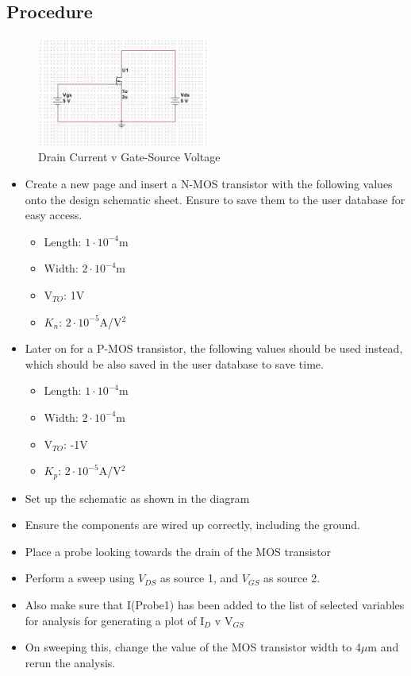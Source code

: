\documentclass[12pt]{article}
\begin{document}
\subsection{Procedure}
\begin{figure}[h]
\centering
\includegraphics[width=0.5\textwidth]{2.jpg}
\caption{Drain Current v Gate-Source Voltage}
\end{figure}
\begin{itemize}
\item Create a new page and insert a N-MOS transistor with the following values onto the design schematic sheet. Ensure to save them to the user database for easy access.
\begin{itemize}
\item Length: $1\cdot10^{-4}$m
\item Width: $2\cdot10^{-4}$m
\item V$_{TO}$: 1V
\item $K_n$: $2\cdot10^{-5}$A/V${^2}$
\end{itemize}
\item Later on for a P-MOS transistor, the following values should be used instead, which should be also saved in the user database to save time.
\begin{itemize}
\item Length: $1\cdot10^{-4}$m
\item Width: $2\cdot10^{-4}$m
\item V$_{TO}$: -1V
\item $K_p$: $2\cdot10^{-5}$A/V${^2}$
\end{itemize}
\item Set up the schematic as shown in the diagram
\item Ensure the components are wired up correctly, including the ground.
\item Place a probe looking towards the drain of the MOS transistor
\item Perform a sweep using $V_{DS}$ as source 1, and $V_{GS}$ as source 2.
\item Also make sure that I(Probe1) has been added to the list of selected variables for analysis for generating a plot of I$_D$ v V$_{GS}$
\item On sweeping this, change the value of the MOS transistor width to 4$\mu$m and rerun the analysis.
\end{itemize}
\end{document}
